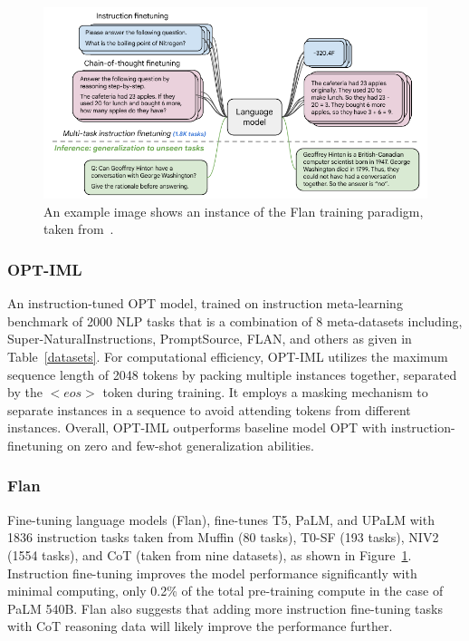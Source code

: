 \begin{figure}[!tbp]
\centering
\includegraphics[width=1\columnwidth]{Figure/Flan.png}
\caption{An example image shows an instance of the Flan training paradigm, taken from~\cite{Flan}.}
\label{flan_image}
\end{figure}
\subsubsection{OPT-IML~\cite{OPT_IML}}
An instruction-tuned OPT model, trained on instruction meta-learning benchmark of 2000 NLP tasks that is a combination of 8 meta-datasets including, Super-NaturalInstructions, PromptSource, FLAN, and others as given in Table~\ref{datasets}. For computational efficiency, OPT-IML utilizes the maximum sequence length of 2048 tokens by packing multiple instances together, separated by the $<eos>$ token during training. It employs a masking mechanism to separate instances in a sequence to avoid attending tokens from different instances. Overall, OPT-IML outperforms baseline model OPT with instruction-finetuning on zero and few-shot generalization abilities.

\subsubsection{Flan~\cite{Flan}}
Fine-tuning language models (Flan), fine-tunes T5, PaLM, and UPaLM with 1836 instruction tasks taken from Muffin (80 tasks), T0-SF (193 tasks), NIV2 (1554 tasks), and CoT (taken from nine datasets), as shown in Figure~\ref{flan_image}. Instruction fine-tuning improves the model performance significantly with minimal computing, only 0.2\% of the total pre-training compute in the case of PaLM 540B. Flan also suggests that adding more instruction fine-tuning tasks with CoT reasoning data will likely improve the performance further.   








